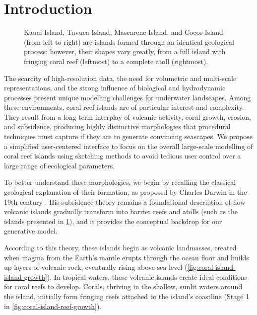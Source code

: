 \section{Introduction}
\label{sec:coral-island-introduction}

\begin{figure}[H]
    \caption[Different islands with coral reefs]{Kauai Island, Tuvuca Island, Mascarene Island, and Cocos Island (from left to right) are islands formed through an identical geological process; however, their shapes vary greatly, from a full island with fringing coral reef (leftmost) to a complete atoll (rightmost).}
    \label{fig:coral-island-island-examples}
\end{figure}

The scarcity of high-resolution data, the need for volumetric and multi-scale representations, and the strong influence of biological and hydrodynamic processes present unique modelling challenges for underwater landscapes. Among these environments, coral reef islands are of particular interest and complexity. They result from a long-term interplay of volcanic activity, coral growth, erosion, and subsidence, producing highly distinctive morphologies that procedural techniques must capture if they are to generate convincing seascapes. %
We propose a simplified user-centered interface to focus on the overall large-scale modelling of coral reef islands using sketching methods to avoid tedious user control over a large range of ecological parameters.

To better understand these morphologies, we begin by recalling the classical geological explanation of their formation, as proposed by Charles Darwin in the 19th century \cite{Darwin1842}. His subsidence theory remains a foundational description of how volcanic islands gradually transform into barrier reefs and atolls (such as the islands presented in \cref{fig:coral-island-island-examples}), and it provides the conceptual backdrop for our generative model.

According to this theory, these islands begin as volcanic landmasses, created when magma from the Earth's mantle erupts through the ocean floor and builds up layers of volcanic rock, eventually rising above sea level (\cref{fig:coral-island-island-growth}). In tropical waters, these volcanic islands create ideal conditions for coral reefs to develop. Corals, thriving in the shallow, sunlit waters around the island, initially form fringing reefs attached to the island's coastline (Stage 1 in \cref{fig:coral-island-reef-growth}).

